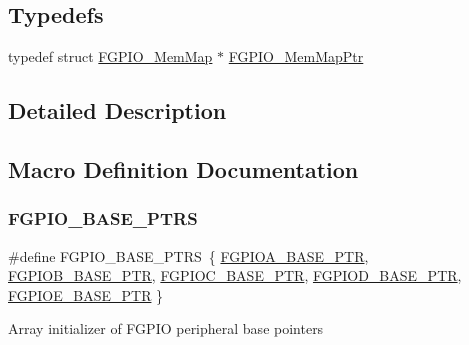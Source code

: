 \subsection*{Typedefs}
\begin{DoxyCompactItemize}
\item 
typedef struct \hyperlink{struct_f_g_p_i_o___mem_map}{F\+G\+P\+I\+O\+\_\+\+Mem\+Map} $\ast$ \hyperlink{group___f_g_p_i_o___peripheral_gaeed3beeb5e5c99ae5b0e404b21466e55}{F\+G\+P\+I\+O\+\_\+\+Mem\+Map\+Ptr}
\end{DoxyCompactItemize}


\subsection{Detailed Description}


\subsection{Macro Definition Documentation}
\mbox{\label{group___f_g_p_i_o___peripheral_ga58956e4d0a0ffec3e1dd70e77a5160b4}} 
\subsubsection{\texorpdfstring{F\+G\+P\+I\+O\+\_\+\+B\+A\+S\+E\+\_\+\+P\+T\+RS}{FGPIO\_BASE\_PTRS}}
{\footnotesize\ttfamily \#define F\+G\+P\+I\+O\+\_\+\+B\+A\+S\+E\+\_\+\+P\+T\+RS~\{ \hyperlink{group___f_g_p_i_o___peripheral_gab3a191da68ebf432fd4f94966600d287}{F\+G\+P\+I\+O\+A\+\_\+\+B\+A\+S\+E\+\_\+\+P\+TR}, \hyperlink{group___f_g_p_i_o___peripheral_gab93f90411688e9bf030a19bda18ba512}{F\+G\+P\+I\+O\+B\+\_\+\+B\+A\+S\+E\+\_\+\+P\+TR}, \hyperlink{group___f_g_p_i_o___peripheral_ga6e8da1b292ae2db0692bbb91a63eb0cc}{F\+G\+P\+I\+O\+C\+\_\+\+B\+A\+S\+E\+\_\+\+P\+TR}, \hyperlink{group___f_g_p_i_o___peripheral_ga9c6c1b7ee627c12dd837efcb09e23d15}{F\+G\+P\+I\+O\+D\+\_\+\+B\+A\+S\+E\+\_\+\+P\+TR}, \hyperlink{group___f_g_p_i_o___peripheral_ga07d1ba914f3ded63431edec77d4544ee}{F\+G\+P\+I\+O\+E\+\_\+\+B\+A\+S\+E\+\_\+\+P\+TR} \}}

Array initializer of F\+G\+P\+IO peripheral base pointers \mbox{\label{group___f_g_p_i_o___peripheral_gab3a191da68ebf432fd4f94966600d287}} 
